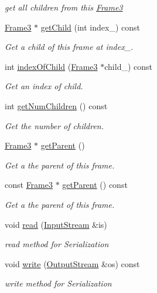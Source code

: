 \begin{DoxyCompactItemize}
\begin{DoxyCompactList}\small\item\em get all children from this \hyperlink{class_magnum_1_1_frame3}{Frame3} \end{DoxyCompactList}\item 
\hyperlink{class_magnum_1_1_frame3}{Frame3} $\ast$ \hyperlink{class_magnum_1_1_frame3_a2bf739f149f6dd645358f2c74aa95aee}{get\+Child} (int index\+\_\+) const 
\begin{DoxyCompactList}\small\item\em Get a child of this frame at index\+\_\+. \end{DoxyCompactList}\item 
int \hyperlink{class_magnum_1_1_frame3_aa72ca808937dd7f99e96dfd6076c6ec3}{index\+Of\+Child} (\hyperlink{class_magnum_1_1_frame3}{Frame3} $\ast$child\+\_\+) const 
\begin{DoxyCompactList}\small\item\em Get an index of child. \end{DoxyCompactList}\item 
int \hyperlink{class_magnum_1_1_frame3_a0223522857c808e4a416a1ff07e1380f}{get\+Num\+Children} () const 
\begin{DoxyCompactList}\small\item\em Get the number of children. \end{DoxyCompactList}\item 
\hyperlink{class_magnum_1_1_frame3}{Frame3} $\ast$ \hyperlink{class_magnum_1_1_frame3_a08c5e5cb5e2127e9c8a166005abda231}{get\+Parent} ()
\begin{DoxyCompactList}\small\item\em Get a the parent of this frame. \end{DoxyCompactList}\item 
const \hyperlink{class_magnum_1_1_frame3}{Frame3} $\ast$ \hyperlink{class_magnum_1_1_frame3_af88c07c4e894af72f64252b2c71d9483}{get\+Parent} () const 
\begin{DoxyCompactList}\small\item\em Get a the parent of this frame. \end{DoxyCompactList}\item 
void \hyperlink{class_magnum_1_1_frame3_a5b55d9b9364953e903f6863efe16541a}{read} (\hyperlink{class_magnum_1_1_input_stream}{Input\+Stream} \&is)
\begin{DoxyCompactList}\small\item\em read method for Serialization \end{DoxyCompactList}\item 
void \hyperlink{class_magnum_1_1_frame3_ab0ae20eaa0b37da4370279231c3479bf}{write} (\hyperlink{class_magnum_1_1_output_stream}{Output\+Stream} \&os) const 
\begin{DoxyCompactList}\small\item\em write method for Serialization \end{DoxyCompactList}\end{DoxyCompactItemize}
